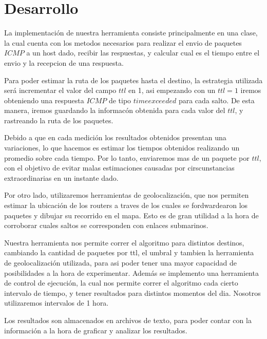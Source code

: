 \section{Desarrollo}


La implementaci\'on de nuestra herramienta consiste principalmente en una clase, la cual cuenta con los metodos necesarios para realizar el envio de paquetes $ICMP$ a un host dado, recibir las respuestas, y calcular cual es el tiempo entre el envio y la recepcion de una respuesta. 

Para poder estimar la ruta de los paquetes hasta el destino, la estrategia utilizada ser\'a incrementar el valor del campo $ttl$ en 1, asi empezando con un $ttl = 1$ iremos obteniendo una respuesta $ICMP$ de tipo $time exceeded$ para cada salto. De esta manera, iremos guardando la informac\'on obtenida para cada valor del $ttl$, y rastreando la ruta de los paquetes.

Debido a que en cada medici\'on los resultados obtenidos presentan una variaciones, lo que hacemos es estimar los tiempos obtenidos realizando un promedio sobre cada tiempo. Por lo tanto, enviaremos mas de un paquete por $ttl$, con el objetivo de evitar malas estimaciones causadas por cirscunstancias extraordinarias en un instante dado.

Por otro lado, utilizaremos herramientas de geolocalizaci\'on, que nos permiten estimar la ubicaci\'on de los routers a traves de los cuales se fordwardearon los paquetes y dibujar su recorrido en el mapa. Esto es de gran utilidad a la hora de corroborar cuales saltos se corresponden con enlaces submarinos.

Nuestra herramienta nos permite correr el algoritmo para distintos destinos, cambiando la cantidad de paquetes por ttl, el umbral y tambien la herramienta de geolocalizaci\'on utilizada, para asi poder tener una mayor capacidad de posibilidades a la hora de experimentar.
Adem\'as se implemento una herramienta de control de ejecuci\'on, la cual nos permite correr el algoritmo cada cierto intervalo de tiempo, y tener resultados para distintos momentos del dia. Nosotros utilizaremos intervalos de 1 hora.


Los resultados son almacenados en archivos de texto, para poder contar con la informaci\'on a la hora de graficar y analizar los resultados.
